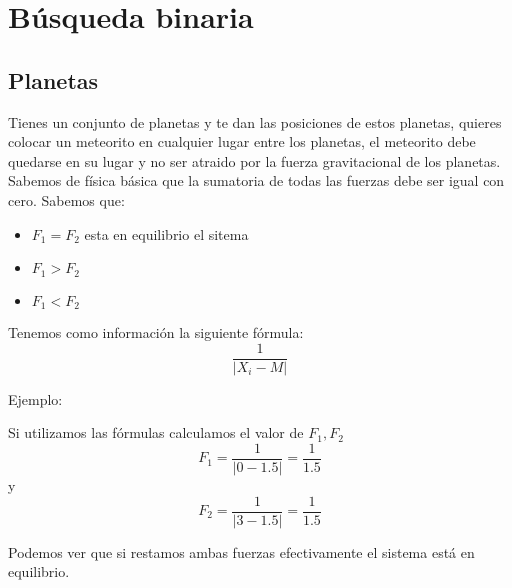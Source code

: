 \chapter{Búsqueda binaria}

\section{Planetas}
Tienes un conjunto de planetas y te dan las posiciones de estos planetas, quieres colocar un meteorito en cualquier lugar entre los planetas, el meteorito debe quedarse en su lugar y no ser atraido por la fuerza gravitacional de los planetas. 
Sabemos de física básica que la sumatoria de todas las fuerzas debe ser igual con cero. Sabemos que:
\begin{itemize}
    \item $F_{1} = F_{2}$ esta en equilibrio el sitema
    \item $F_{1} > F_{2}$
    \item $F_{1} < F_{2}$
\end{itemize}

Tenemos como información la siguiente fórmula:
\[
    \frac{1}{|X_{i} - M|}    
\]

Ejemplo:
\begin{figure}[H]
    \begin{center}
    \end{center}
\end{figure}

Si utilizamos las fórmulas calculamos el valor de $F_{1}, F_{2}$
\[
    F_{1} = \frac{1}{|0 - 1.5|} = \frac{1}{1.5}    
\]
y
\[
    F_{2} = \frac{1}{|3 - 1.5|} = \frac{1}{1.5}    
\]

Podemos ver que si restamos ambas fuerzas efectivamente el sistema está en equilibrio.

